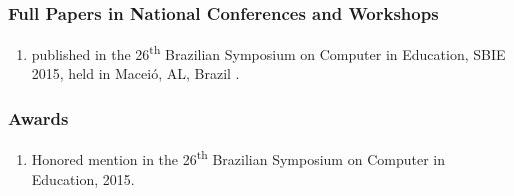 \subsubsection*{Full Papers in National Conferences and Workshops}

\begin{enumerate}
\item
{} published in the 26\textsuperscript{th} Brazilian Symposium on Computer in Education, SBIE 2015, held in Maceió, AL, Brazil \cite{ChallcoAndradeOliveiraMizoguchiIsotani2015}.
\end{enumerate}



\subsubsection*{Awards}

\begin{enumerate}
\item
Honored mention in the 26\textsuperscript{th} Brazilian Symposium on Computer in Education, 2015.
\end{enumerate}





